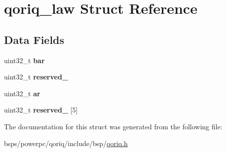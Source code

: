\hypertarget{structqoriq__law}{}\section{qoriq\+\_\+law Struct Reference}
\label{structqoriq__law}
\subsection*{Data Fields}
\begin{DoxyCompactItemize}
\item 
\mbox{\label{structqoriq__law_a748a22da5f4465659535fd824fdccc00}} 
uint32\+\_\+t {\bfseries bar}
\item 
\mbox{\label{structqoriq__law_ac7546a6d9f80be98a4fcd2cf69916321}} 
uint32\+\_\+t {\bfseries reserved\+\_}
\item 
\mbox{\label{structqoriq__law_a1c0f5d6fa7dc05d178bcfb5663804e7b}} 
uint32\+\_\+t {\bfseries ar}
\item 
\mbox{\label{structqoriq__law_a8359d27c7f7a97a70d67088655686453}} 
uint32\+\_\+t {\bfseries reserved\+\_} \mbox{[}5\mbox{]}
\end{DoxyCompactItemize}


The documentation for this struct was generated from the following file\+:\begin{DoxyCompactItemize}
\item 
bsps/powerpc/qoriq/include/bsp/\mbox{\hyperlink{qoriq_8h}{qoriq.\+h}}\end{DoxyCompactItemize}
